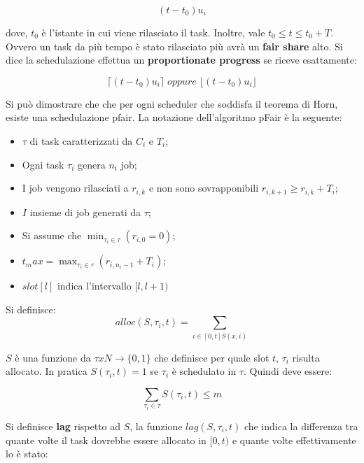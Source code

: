 \documentclass[11pt,a4paper]{report}
\begin{document}
\begin{equation}
    (t -t_0) u_i
\end{equation}

dove, $t_0$ è l'istante in cui viene rilasciato il task. Inoltre, vale $t_0 \leq t \leq t_0 +T$. Ovvero un task da più tempo è stato rilasciato più avrà un \textbf{fair share} alto. Si dice la schedulazione effettua un \textbf{proportionate progress} se riceve esattamente:

\begin{equation}
    \lceil(t -t_0) u_i\rceil \; oppure \; \lfloor(t -t_0) u_i\rfloor
\end{equation}

Si può dimostrare che che per ogni scheduler che soddisfa il teorema di Horn, esiste una schedulazione pfair. La notazione dell'algoritmo pFair è la seguente:

\begin{itemize}
    \item $\tau$ di task caratterizzati da $C_i$ e $T_i$;
    \item Ogni task $\tau_i$ genera $n_i$ job;
    \item I job vengono rilasciati a $r_{i,k}$ e non sono sovrapponibili $r_{i,k+1}\ge r_{i,k} + T_i$;
    \item $I$ insieme di job generati da $\tau$;
    \item Si assume che $\min_{\tau_i \in \tau}(r_{i,0} = 0)$;
    \item $t_max = \max_{\tau_i\in\tau}(r_{i,n_{i}-1} + T_i)$;
    \item $slot[l]$ indica l'intervallo $[l, l+1)$
\end{itemize}

Si definisce:
\begin{equation}
    alloc(S, \tau_i, t) = \sum_{i\in[0, t] S(x, i)}
\end{equation}

$S$ è una funzione da $\tau x N \to \{0, 1\}$ che definisce per quale slot $t$, $\tau_i$ risulta allocato. In pratica $S(\tau_i, t) = 1$ se $\tau_i$ è schedulato in $\tau$. Quindi deve essere:

\begin{equation}
     \sum_{\tau_i \in \tau} S(\tau_i, t) \leq m
\end{equation}

Si definisce \textbf{lag} rispetto ad $S$, la funzione $lag(S, \tau_i, t)$ che indica la differenza tra quante volte il task dovrebbe essere allocato in $[0, t)$ e quante volte effettivamente lo è stato:
\end{document}
